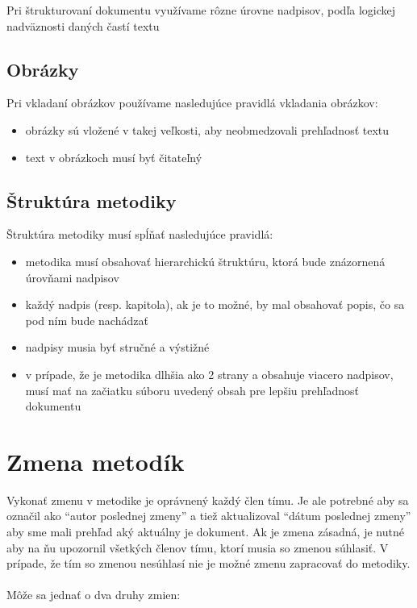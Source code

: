 \documentclass{article}
\begin{document}
            \noindent \textnormal{Pri štrukturovaní dokumentu využívame rôzne úrovne nadpisov, podľa logickej nadväznosti daných častí textu}


        \subsection*{Obrázky}

            \textnormal{Pri vkladaní obrázkov používame nasledujúce pravidlá vkladania obrázkov:}

            \begin{itemize}
                \item obrázky sú vložené v takej veľkosti, aby neobmedzovali prehľadnosť textu
                \item text v obrázkoch musí byť čitateľný
            \end{itemize}

        \subsection*{Štruktúra metodiky}

            \textnormal{Štruktúra metodiky musí spĺňať nasledujúce pravidlá:}

            \begin{itemize}
                \item metodika musí obsahovať hierarchickú štruktúru, ktorá bude znázornená úrovňami nadpisov
                \item každý nadpis (resp. kapitola), ak je to možné, by mal obsahovať popis, čo sa pod ním bude nachádzať
                \item nadpisy musia byť stručné a výstižné
                \item v prípade, že je metodika dlhšia ako 2 strany a obsahuje viacero nadpisov, musí mať na začiatku súboru uvedený obsah pre lepšiu prehľadnosť dokumentu
            \end{itemize}

    \section*{Zmena metodík}

        \textnormal{Vykonať zmenu v metodike je oprávnený každý člen tímu. Je ale potrebné aby sa označil ako “autor poslednej zmeny” a tiež aktualizoval “dátum poslednej zmeny” aby sme mali prehľad aký aktuálny je dokument. Ak je zmena zásadná, je nutné aby na ňu upozornil všetkých členov tímu, ktorí musia so zmenou súhlasiť. V prípade, že tím so zmenou nesúhlasí nie je možné zmenu zapracovať do metodiky.} \\\\
        \textnormal{Môže sa jednať o dva druhy zmien:}
\end{document}
